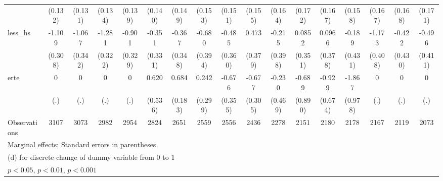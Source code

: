{\begin{tabular}{l*{16}{c}}
                    &     (0.132)         &     (0.131)         &     (0.134)         &     (0.139)         &     (0.140)         &     (0.149)         &     (0.153)         &     (0.151)         &     (0.155)         &     (0.164)         &     (0.172)         &     (0.167)         &     (0.158)         &     (0.167)         &     (0.168)         &     (0.171)         \\
[1em]
less\_hs             &      -1.109\sym{***}&      -1.067\sym{**} &      -1.281\sym{***}&      -0.901\sym{**} &      -0.351         &      -0.367         &      -0.680         &      -0.485         &       0.473         &      -0.215         &      0.0852         &      0.0966         &      -0.189         &      -1.173\sym{**} &      -0.422         &      -0.496         \\
                    &     (0.308)         &     (0.342)         &     (0.322)         &     (0.329)         &     (0.331)         &     (0.348)         &     (0.394)         &     (0.360)         &     (0.379)         &     (0.398)         &     (0.351)         &     (0.378)         &     (0.431)         &     (0.408)         &     (0.430)         &     (0.411)         \\
[1em]
erte                &           0         &           0         &           0         &           0         &       0.620         &       0.684\sym{***}&       0.242         &      -0.676         &      -0.677\sym{*}  &      -0.230         &      -0.689         &      -0.929         &      -1.867         &           0         &           0         &           0         \\
                    &         (.)         &         (.)         &         (.)         &         (.)         &     (0.536)         &     (0.183)         &     (0.299)         &     (0.355)         &     (0.305)         &     (0.469)         &     (0.890)         &     (0.674)         &     (0.978)         &         (.)         &         (.)         &         (.)         \\
\hline
Observations        &        3107         &        3073         &        2982         &        2954         &        2824         &        2651         &        2559         &        2556         &        2436         &        2278         &        2151         &        2180         &        2178         &        2167         &        2119         &        2073         \\
\hline\hline
\multicolumn{17}{l}{\footnotesize Marginal effects; Standard errors in parentheses}\\
\multicolumn{17}{l}{\footnotesize  (d) for discrete change of dummy variable from 0 to 1}\\
\multicolumn{17}{l}{\footnotesize \sym{*} \(p<0.05\), \sym{**} \(p<0.01\), \sym{***} \(p<0.001\)}\\
\end{tabular}
}
